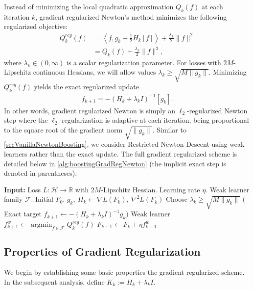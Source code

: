\documentclass{article}
\theoremstyle{plain}
\theoremstyle{definition}
\theoremstyle{remark}
\newcommand{\bbR}{\mathbb{R}}
\DeclareMathOperator*{\argmin}{argmin}
\begin{document}
Instead of minimizing the local quadratic approximation $Q_k(f)$ at each iteration $k$, gradient regularized Newton's method minimizes the following regularized objective:
\begin{align*}
    Q_k^{reg}(f) 
    &= \left\langle f,g_k + \frac{1}{2}H_k[f]  \right\rangle + \frac{\lambda_k}{2}\|f\|^2 \\
    &= Q_k(f) + \frac{\lambda_k}{2}\|f\|^2,
\end{align*}
where $\lambda_k \in (0, \infty)$ is a scalar regularization parameter. For losses with $2M$-Lipschitz continuous Hessians, we will allow values $\lambda_k \geq \sqrt{M\|g_k\|}$. Minimizing $Q_k^{reg}(f)$ yields the exact regularized update
\begin{align}\label{eqRegBoostingRoundExact}
    f_{k+1}  = - (H_k + \lambda_k I)^{-1}[g_k].
\end{align}
In other words, gradient regularized Newton is simply an $\ell_2$-regularized Newton step where the $\ell_2$-regularization is adaptive at each iteration, being proportional to the square root of the gradient norm $\sqrt{\|g_k\|}$. Similar to \cref{secVanillaNewtonBoosting}, we consider Restricted Newton Descent using weak learners rather than the exact update. The full gradient regularized scheme is detailed below in \cref{alg:boostingGradRegNewton} (the implicit exact step is denoted in parentheses):
\begin{algorithm}[H]
\caption{Gradient-Regularized Restricted Newton}
\label{alg:boostingGradRegNewton}
\begin{algorithmic}[1]
    \STATE \textbf{Input:} Loss $L:\mathcal{H}\to\bbR$ with $2M$-Lipschitz Hessian. Learning rate $\eta$. Weak learner family $\mathcal{F}$. Initial $F_0$.
        \STATE $g_k, \: H_k \leftarrow \nabla L(F_k), \: \nabla^2L(F_k)$
        \STATE Choose $\lambda_k \geq \sqrt{M\|g_k\|}$
        \STATE $\big($Exact target $f_{k+1} \leftarrow - (H_k + \lambda_k I)^{-1}g_k \big)$
        \STATE Weak learner $f^{w}_{k+1} \leftarrow \argmin_{f \in \mathcal{F}} Q_k^{reg}(f)$
        \STATE $F_{k+1} \leftarrow F_k + \eta f^{w}_{k+1}$
    \ENDFOR
\end{algorithmic}
\end{algorithm}




\subsection{Properties of Gradient Regularization}
We begin by establishing some basic properties the gradient regularized scheme. In the subsequent analysis, define $K_k := H_k + \lambda_k I$.
\end{document}
